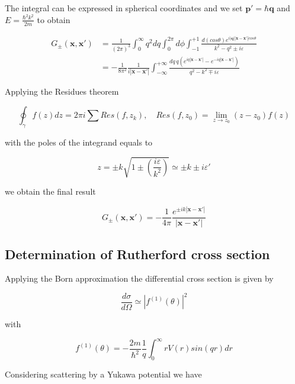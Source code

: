 \documentclass{article}
\begin{document}
The integral can be expressed in spherical coordinates and we set \(\bm{p'} = \hbar\bm{q} \) and \( E = \frac{\hbar^2k^2}{2m} \) to obtain

\begin{align}
G_{\pm}(\bm{x},\bm{x'}) & = \frac{1}{(2\pi)^3} \int_0^{\infty} q^2 dq \int_0^{2\pi} d\phi \int_{-1}^{+1} \frac{d(cos\theta)e^{i|\bm{q}||\bm{x}-\bm{x'}|cos\theta}}{k^2-q^2\pm i\varepsilon} \nonumber \\
& = -\frac{1}{8\pi^2} \frac{1}{i|\bm{x}-\bm{x'}|} \int_{-\infty}^{+\infty} \frac{dq \, q \left( e^{iq|\bm{x}-\bm{x'}|} - e^{-iq|\bm{x}-\bm{x'}|} \right)}{q^2 - k^2 \mp i\varepsilon}
\end{align}

Applying the Residues theorem

\begin{equation}
\oint_{\gamma} f(z) dz = 2\pi i \sum Res(f,z_k), \quad Res(f,z_0) = \lim_{z\to z_0}(z-z_0)f(z) 
\end{equation}

with the poles of the integrand equals to

\begin{equation}
z = \pm k \sqrt{1\pm \left(\frac{i\varepsilon}{k^2}\right)} \simeq \pm k \pm i\varepsilon'
\end{equation}

we obtain the final result

\begin{equation}
G_{\pm}(\bm{x},\bm{x'}) = -\frac{1}{4\pi} \frac{e^{\pm ik |\bm{x}-\bm{x'}|}}{|\bm{x}-\bm{x'}|}
\end{equation}

\subsection{Determination of Rutherford cross section}
Applying the Born approximation the differential cross section is given by

\begin{equation}
\frac{d\sigma}{d\Omega} \simeq |f^{(1)}(\theta)|^2
\end{equation}

with

\begin{equation}
\label{eq:f_born}
f^{(1)}(\theta) = -\frac{2m}{\hbar^2} \frac{1}{q} \int_0^{\infty} rV(r)sin(qr) dr
\end{equation}

Considering scattering by a Yukawa potential we have
\end{document}
